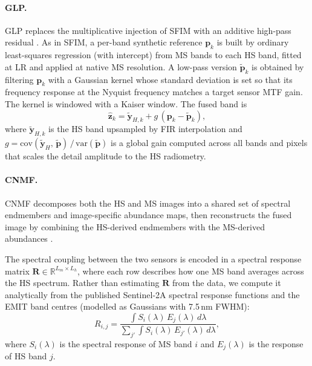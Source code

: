 \paragraph{GLP.}
GLP replaces the multiplicative injection of SFIM with an additive high-pass residual \cite{aiazzi2006mtf}. As in SFIM, a per-band synthetic reference \(\mathbf{p}_k\) is built by ordinary least-squares regression (with intercept) from MS bands to each HS band, fitted at LR and applied at native MS resolution. A low-pass version \(\widetilde{\mathbf{p}}_k\) is obtained by filtering \(\mathbf{p}_k\) with a Gaussian kernel whose standard deviation is set so that its frequency response at the Nyquist frequency matches a target sensor MTF gain. The kernel is windowed with a Kaiser window. The fused band is
\[
  \widehat{\mathbf{z}}_k
    = \widetilde{\mathbf{y}}_{H,k}
      + g\,(\mathbf{p}_k - \widetilde{\mathbf{p}}_k),
\]
where \(\widetilde{\mathbf{y}}_{H,k}\) is the HS band upsampled by FIR interpolation and \(g = \mathrm{cov}(\widetilde{\mathbf{y}}_{H},\, \widetilde{\mathbf{p}}) \,/\, \mathrm{var}(\widetilde{\mathbf{p}})\) is a global gain computed across all bands and pixels that scales the detail amplitude to the HS radiometry.

\paragraph{CNMF.}
CNMF decomposes both the HS and MS images into a shared set of spectral endmembers and image-specific abundance maps, then reconstructs the fused image by combining the HS-derived endmembers with the MS-derived abundances \cite{yokoya2012cnmf}.

The spectral coupling between the two sensors is encoded in a spectral response matrix \(\mathbf{R} \in \mathbb{R}^{L_m \times L_h}\), where each row describes how one MS band averages across the HS spectrum. Rather than estimating \(\mathbf{R}\) from the data, we compute it analytically from the published Sentinel-2A spectral response functions and the EMIT band centres (modelled as Gaussians with 7.5\,nm FWHM):
\begin{equation}
  R_{i,j} = \frac{\int S_i(\lambda)\, E_j(\lambda)\, d\lambda}
                  {\sum_{j'} \int S_i(\lambda)\, E_{j'}(\lambda)\, d\lambda},
  \label{eq:srf_R}
\end{equation}
where \(S_i(\lambda)\) is the spectral response of MS band \(i\) and \(E_j(\lambda)\) is the response of HS band \(j\).

